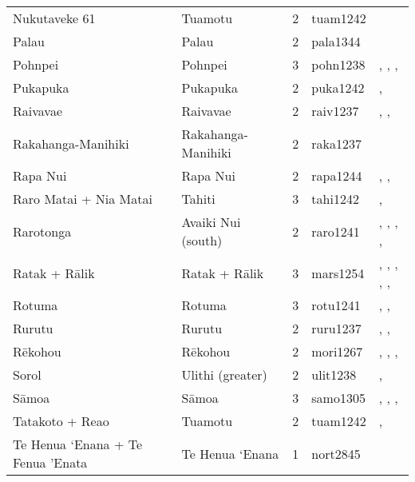 \begin{longtable}{p{3cm}p{3cm}p{2cm}p{2cm}p{4cm}}
  Nukutaveke 61 & Tuamotu & 2 & tuam1242 & \citet{emory1975material} \\ 
  Palau & Palau & 2 & pala1344 & \citet{force1960leadership} \\ 
  Pohnpei & Pohnpei & 3 & pohn1238 & \citet{hanlon2019upon}, \citet{haun1984prehistoric}, \citet{raynor1991indigenous}, \citet{riesenberg1968native} \\ 
  Pukapuka & Pukapuka & 2 & puka1242 & \citet{beagleholeandbeaglehole1938}, \citet{macgregor1935} \\ 
  Raivavae & Raivavae & 2 & raiv1237 & \citet{aitken1930ethnology}, \citet{bollt2008excavations}, \citet{edwards2003archaeological} \\ 
  Rakahanga-Manihiki & Rakahanga-Manihiki & 2 & raka1237 & \citet{buck1932a} \\ 
  Rapa Nui & Rapa Nui & 2 & rapa1244 & \citet{sahlins1958social}, \citet{kirch1984evolution}, \citet{metraux_1971} \\ 
  Raro Matai + Nia Matai & Tahiti & 3 & tahi1242 & \citet{oliver2019ancient}, \citet{oliver2019ancient} \\ 
  Rarotonga & Avaiki Nui (south) & 2 & raro1241 & \citet{bellwood1971varieties}, \citet{buck1934}, \citet{crocombe_1967}, \citet{hayes1981cook}, \citet{walter1996} \\ 
  Ratak + Rālik & Ratak + Rālik & 3 & mars1254 & \citet{carruci1991marshall}, \citet{carruci1991marshall}, \citet{erdland1914}, \citet{erdland1914}, \citet{williamson_1982}, \citet{williamson_1982} \\ 
  Rotuma & Rotuma & 3 & rotu1241 & \citet{gardiner1898natives}, \citet{howard1963conservatism}, \citet{howard1991} \\ 
  Rurutu & Rurutu & 2 & ruru1237 & \citet{aitken1930ethnology}, \citet{bollt2008excavations}, \citet{edwards2003archaeological} \\ 
  Rēkohou & Rēkohou & 2 & mori1267 & \citet{sahlins1958social}, \citet{buck1952}, \citet{kirch1984evolution}, \citet{van1995maori} \\ 
  Sorol & Ulithi (greater) & 2 & ulit1238 & \citet{lessa1950}, \citet{lessa1966} \\ 
  Sāmoa & Sāmoa & 3 & samo1305 & \citet{sahlins1958social}, \citet{buck1930}, \citet{keesing1934}, \citet{watters_1958} \\ 
  Tatakoto + Reao & Tuamotu & 2 & tuam1242 & \citet{emory1975material}, \citet{emory1975material} \\ 
  Te Henua ‘Enana + Te Fenua ’Enata & Te Henua ‘Enana & 1 & nort2845 & \citet{sahlins1958social} \\ 

\end{longtable}

